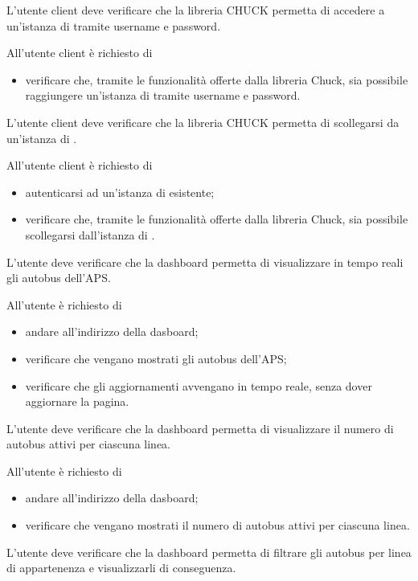 	L'utente client deve verificare che la libreria CHUCK permetta di accedere a un'istanza di \projectname{} tramite username e password.
		
		All'utente client è richiesto di
		\begin{itemize}
			\item verificare che, tramite le funzionalità offerte dalla libreria Chuck, sia possibile raggiungere un'istanza di \projectname{} tramite username e password.
		\end{itemize}

	L'utente client deve verificare che la libreria CHUCK permetta di scollegarsi da un'istanza di \projectname{}.

		All'utente client è richiesto di
		\begin{itemize}
			\item autenticarsi ad un'istanza di \projectname{} esistente;
			\item verificare che, tramite le funzionalità offerte dalla libreria Chuck, sia possibile scollegarsi dall'istanza di \projectname{}.
		\end{itemize}

	L'utente deve verificare che la dashboard permetta di visualizzare in tempo reali gli autobus dell'APS.

		All'utente è richiesto di
		\begin{itemize}
			\item andare all'indirizzo della dasboard;
			\item verificare che vengano mostrati gli autobus dell'APS;
			\item verificare che gli aggiornamenti avvengano in tempo reale, senza dover aggiornare la pagina.
		\end{itemize}

	L'utente deve verificare che la dashboard permetta di visualizzare il numero di autobus attivi per ciascuna linea.

		All'utente è richiesto di
		\begin{itemize}
			\item andare all'indirizzo della dasboard;
			\item verificare che vengano mostrati il numero di autobus attivi per ciascuna linea.
		\end{itemize}

	L'utente deve verificare che la dashboard permetta di filtrare gli autobus per linea di appartenenza e visualizzarli di conseguenza.

